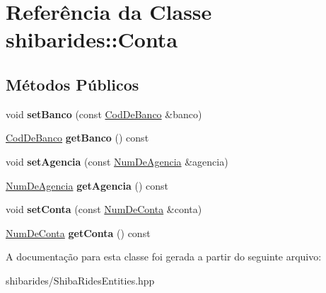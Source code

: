 \hypertarget{classshibarides_1_1Conta}{}\section{Referência da Classe shibarides\+:\+:Conta}
\label{classshibarides_1_1Conta}
\subsection*{Métodos Públicos}
\begin{DoxyCompactItemize}
\item 
void {\bfseries set\+Banco} (const \hyperlink{classshibarides_1_1CodDeBanco}{Cod\+De\+Banco} \&banco)\hypertarget{classshibarides_1_1Conta_a9300f2180e88b9df87343193c926badf}{}\label{classshibarides_1_1Conta_a9300f2180e88b9df87343193c926badf}

\item 
\hyperlink{classshibarides_1_1CodDeBanco}{Cod\+De\+Banco} {\bfseries get\+Banco} () const \hypertarget{classshibarides_1_1Conta_a40bb0d5f152f61b26a7bd6174af1124f}{}\label{classshibarides_1_1Conta_a40bb0d5f152f61b26a7bd6174af1124f}

\item 
void {\bfseries set\+Agencia} (const \hyperlink{classshibarides_1_1NumDeAgencia}{Num\+De\+Agencia} \&agencia)\hypertarget{classshibarides_1_1Conta_a53957be04cf0cd5a7fb783c7d320aa74}{}\label{classshibarides_1_1Conta_a53957be04cf0cd5a7fb783c7d320aa74}

\item 
\hyperlink{classshibarides_1_1NumDeAgencia}{Num\+De\+Agencia} {\bfseries get\+Agencia} () const \hypertarget{classshibarides_1_1Conta_a4131ed3a711e4dd69a9adf3f66cb9abc}{}\label{classshibarides_1_1Conta_a4131ed3a711e4dd69a9adf3f66cb9abc}

\item 
void {\bfseries set\+Conta} (const \hyperlink{classshibarides_1_1NumDeConta}{Num\+De\+Conta} \&conta)\hypertarget{classshibarides_1_1Conta_ac04fa978221a3b76cd64878ad6853dc7}{}\label{classshibarides_1_1Conta_ac04fa978221a3b76cd64878ad6853dc7}

\item 
\hyperlink{classshibarides_1_1NumDeConta}{Num\+De\+Conta} {\bfseries get\+Conta} () const \hypertarget{classshibarides_1_1Conta_a0f18603982a99ab28e89207ed6bbe96c}{}\label{classshibarides_1_1Conta_a0f18603982a99ab28e89207ed6bbe96c}

\end{DoxyCompactItemize}


A documentação para esta classe foi gerada a partir do seguinte arquivo\+:\begin{DoxyCompactItemize}
\item 
shibarides/Shiba\+Rides\+Entities.\+hpp\end{DoxyCompactItemize}
